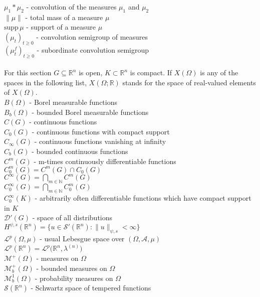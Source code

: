 \documentclass[a4paper, 12pt]{report}
\theoremstyle{cor}
\theoremstyle{remark}
\theoremstyle{definition}
\begin{document}
$\mu_1 \ast \mu_2$ - convolution of the measures $\mu_1$ and $\mu_2$\\
$\|\mu\|$ - total mass of a measure $\mu$\\
$\text{supp}\,\mu$ - support of a measure $\mu$\\
$(\mu_t)_{t \ge 0}$ - convolution semigroup of measures\\
$(\mu_t^f)_{t \ge 0}$ - subordinate convolution semigroup\\
\\
For this section $G \subseteq \mathbb{R}^n$ is open, $K \subset \mathbb{R}^n$ is compact.  If $X(\Omega)$ is any of the spaces in the following list, $X(\Omega; \mathbb{R})$ stands for the space of real-valued elements of $X(\Omega)$.\\
$B(\Omega)$ - Borel measurable functions\\
$B_b(\Omega)$ - bounded Borel measurable functions\\
$C(G)$ - continuous functions\\
$C_0(G)$ - continuous functions with compact support\\
$C_\infty(G)$ - continuous functions vanishing at infinity\\
$C_b(G)$ - bounded continuous functions\\
$C^m(G)$ - m-times continuously differentiable functions\\
$C_0^m(G) = C^m(G) \cap C_0(G)$\\
$C^\infty(G) = \bigcap_{m \in \mathbb{N}}C^m(G)$\\
$C_0^\infty(G) = \bigcap_{m \in \mathbb{N}}C_0^m(G)$\\
$C_0^\infty(K)$ - arbitrarily often differentiable functions which have compact support in $K$\\
$\mathcal{D}'(G)$ - space of all distributions\\
$H^{\psi, s}(\mathbb{R}^n) = \{u \in \mathcal{S}'(\mathbb{R}^n) : \|u\|_{\psi, s} < \infty\}$\\
$\mathcal{L}^p(\Omega, \mu)$ - usual Lebesgue space over $(\Omega, \mathcal{A}, \mu)$\\
$\mathcal{L}^p(\mathbb{R}^n) = \mathcal{L}^p\big(\mathbb{R}^n, \lambda^{(n)}\big)$\\
$\mathcal{M}^+(\Omega)$ - measures on $\Omega$\\
$\mathcal{M}_b^+(\Omega)$ - bounded measures on $\Omega$\\
$\mathcal{M}_b^1(\Omega)$ - probability measures on $\Omega$\\
$\mathcal{S}(\mathbb{R}^n)$ - Schwartz space of tempered functions\\
\end{document}
